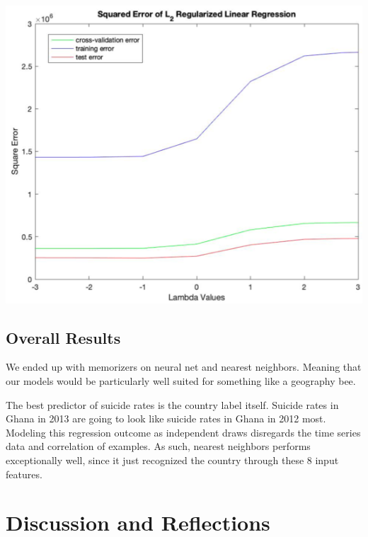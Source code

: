 \documentclass{article}
\begin{document}
\begin{multicols}{2}
\begingroup
    \includegraphics[width=\columnwidth]{lin_reg.png}
    \begin{spacing}{1.2}
    \label{fig:lin_reg_model} 
    \end{spacing}
\endgroup

\subsection{Overall Results}

We ended up with memorizers on neural net and nearest neighbors. Meaning that our models would be particularly well suited for something like a geography bee. 


The best predictor of suicide rates is the country label itself. Suicide rates in Ghana in 2013 are going to look like suicide rates in Ghana in 2012 most. Modeling this regression outcome as independent draws disregards the time series data and correlation of examples. As such, nearest neighbors performs exceptionally well, since it just recognized the country through these 8 input features. 

\section{Discussion and Reflections}


\end{multicols}
\end{document}
